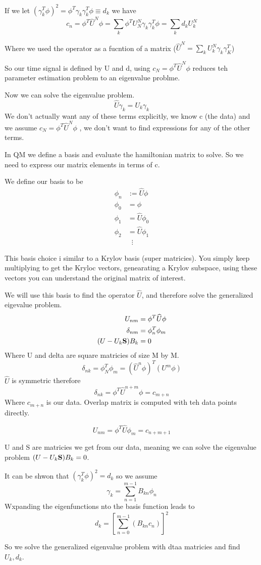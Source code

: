 \documentclass{article}
\newcommand{\be}{\begin{equation}}
\newcommand{\ee}{\end{equation}}
\newcommand{\bS}{\mbox{\bf S}}
\begin{document}
If we let $(\gamma_k^T\phi)^2 = \phi^T\gamma_k \gamma_k^T\phi \equiv d_k$ we have
\be
c_n = \phi^T\widehat{U}^N\phi = \sum_k \phi^T U_N^N \gamma_k\gamma_k^T\phi = \sum_k d_kU_k^N
\ee

Where we used the operator as a fucntion of a matrix ($\widehat{U}^N = \sum_k U_k^N\gamma_k\gamma_K^T$)

So our time signal is defined by U and d, using $c_N=\phi^T\widehat{U}^N\phi$ reduces teh parameter estimation problem to an eigenvalue problme.

Now we can solve the eigenvalue problem.
\be
\widehat{U}\gamma_k = U_k\gamma_k
\ee
We don't actually want any of these terms explicitly, we know c (the data) and we assume $c_N=\phi^T\widehat{U}^N\phi$ , we don't want to find expressions for any of the other terms.

In QM we define a basis and evaluate the hamiltonian matrix to solve.
So we need to express our matrix elements in terms of c.

We define our basis to be
\be
\begin{split}
    \phi_n &:= \widehat{U}\phi\\
    \phi_0 &= \phi\\
    \phi_1 &= \widehat{U}\phi_0\\
    \phi_2 &= \widehat{U}\phi_1\\
    &\;\;\vdots
\end{split}
\ee

This basis choice i similar to a Krylov basis (super matricies).
You simply keep multiplying to get the Kryloc vectors, genearating a Krylov subspace, using these vectors you can understand the original matrix of interest.

We will use this basis to find the operator $\widehat{U}$, and therefore solve the generalized eigevalue problem.
\be
\begin{split}
    U_{nm} &= \phi^T\widehat{U}\phi\\
    \delta_{nm} &= \phi^T_n\phi_m\\
    (U-U_k \bS)B_k&= 0
\end{split}
\ee
Where U and delta are square matricies of size M by M.
\be
\delta_{nk} = \phi_N^T\phi_m = (\widehat{U}^n\phi)^T(U^m\phi)
\ee
$\widehat{U}$ is symmetric therefore
\be
\delta_{nk} = \phi^T\widehat{U}^{n+m}\phi = c_{m+n}
\ee
Where $c_{m+n}$ is our data.
Overlap matrix is computed with teh data points directly.

\be
U_{nm} = \phi^T\widehat{U}\phi_m = c_{n+m+1}
\ee

U and S are matricies we get from our data, meaning we can solve the eigenvalue problem $(U-U_k \bS)B_k= 0$.

It can be shwon that $(\gamma_k^T\phi)^2 = d_k$ so we assume
\be
\gamma_k = \sum_{n=1}^{m-1} B_{kn}\phi_n
\ee
Wxpanding the eigenfunctions nto the basis function leads to
\be
d_k = \left[\sum_{n=0}^{m-1}\left(B_{kn}c_n\right)\right]^2
\ee

So we solve the generalized eigenvalue problem with dtaa matricies and find $U_k, d_k$.
\end{document}
